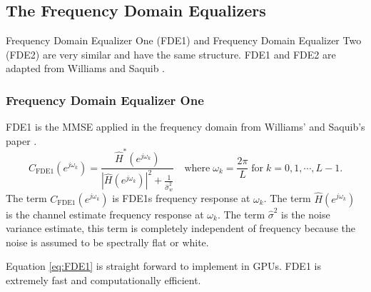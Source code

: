 \clearpage
\subsection{The Frequency Domain Equalizers}
\label{sec:FDE}
Frequency Domain Equalizer One (FDE1) and Frequency Domain Equalizer Two (FDE2) are very similar and have the same structure.
FDE1 and FDE2 are adapted from Williams and Saquib \cite[eq. (11) and (12)]{williams2013linear}.

\subsubsection{Frequency Domain Equalizer One}
FDE1 is the MMSE applied in the frequency domain from Williams' and Saquib's paper \cite[eq. (11)]{williams2013linear}.
\begin{equation}
C_\text{FDE1}(e^{j\omega_k}) = \frac{\hat{H}^\ast(e^{j\omega_k})}  {|\hat{H}(e^{j\omega_k})|^2  +  \frac{1}{\hat{\sigma}^2_w}} \quad
\text{where} \;
\omega_k = \frac{2\pi}{L} \;
\text{for} \;
k=0,1,\cdots,L-1.
\label{eq:FDE1}
\end{equation}
The term $C_\text{FDE1}(e^{j\omega_k})$ is FDE1s frequency response at $\omega_k$.
The term $\hat{H}(e^{j\omega_k})$ is the channel estimate frequency response at $\omega_k$.
The term $\hat{\sigma}^2$ is the noise variance estimate, this term is completely independent of frequency because the noise is assumed to be spectrally flat or white.

Equation \eqref{eq:FDE1} is straight forward to implement in GPUs.
FDE1 is extremely fast and computationally efficient.

